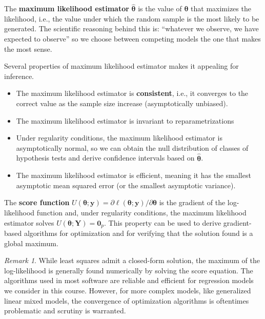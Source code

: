 \documentclass[
  11pt,
  letterpaper,
]{book}
\providecommand{\tightlist}{%
  \setlength{\itemsep}{0pt}\setlength{\parskip}{0pt}}
\theoremstyle{definition}
\theoremstyle{definition}
\theoremstyle{definition}
\theoremstyle{remark}
\newtheorem*{remark}{Remark}
\begin{document}
The \textbf{maximum likelihood estimator} \(\widehat{\boldsymbol{\theta}}\) is the value of \(\boldsymbol{\theta}\) that maximizes the likelihood, i.e., the value under which the random sample is the most likely to be generated. The scientific reasoning behind this is: ``whatever we observe, we have expected to observe'' so we choose between competing models the one that makes the most sense.

Several properties of maximum likelihood estimator makes it appealing for inference.

\begin{itemize}
\tightlist
\item
  The maximum likelihood estimator is \textbf{consistent}, i.e., it converges to the correct value as the sample size increase (asymptotically unbiased).
\item
  The maximum likelihood estimator is invariant to reparametrizations
\item
  Under regularity conditions, the maximum likelihood estimator is asymptotically normal, so we can obtain the null distribution of classes of hypothesis tests and derive confidence intervals based on \(\widehat{\boldsymbol{\theta}}\).
\item
  The maximum likelihood estimator is efficient, meaning it has the smallest asymptotic mean squared error (or the smallest asymptotic variance).
\end{itemize}

The \textbf{score function} \(U(\boldsymbol{\theta}; \boldsymbol{y}) = \partial \ell(\boldsymbol{\theta}; \boldsymbol{y})/ \partial \boldsymbol{\theta}\) is the gradient of the log-likelihood function and, under regularity conditions, the maximum likelihood estimator solves \(U(\boldsymbol{\theta}; \boldsymbol{Y})=\boldsymbol{0}_p\). This property can be used to derive gradient-based algorithms for optimization and for verifying that the solution found is a global maximum.

\begin{remark}
{}While least squares admit a closed-form solution, the maximum of the log-likelihood is generally found numerically by solving the score equation. The algorithms used in most software are reliable and efficient for regression models we consider in this course. However, for more complex models, like generalized linear mixed models, the convergence of optimization algorithms is oftentimes problematic and scrutiny is warranted.
\end{remark}
\end{document}
